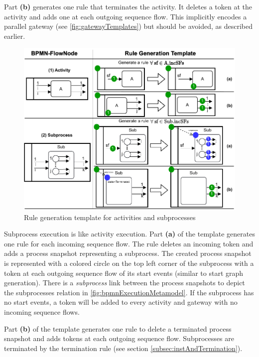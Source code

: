 \documentclass{lmcs} %
\begin{document}
Part \textbf{(b)} generates one rule that terminates the activity.
It deletes a token at the activity and adds one at each outgoing sequence flow.
This implicitly encodes a parallel gateway (see \autoref{fig:gatewayTemplates}) but should be avoided, as described earlier. 

\begin{figure}[ht]
    \centering
    \includegraphics[width=1\textwidth]{images/activities_template.pdf}
    \caption{Rule generation template for activities and subprocesses}
    \label{fig:activityTemplates}
\end{figure}

Subprocess execution is like activity execution.
Part \textbf{(a)} of the template generates one rule for each incoming sequence flow.
The rule deletes an incoming token and adds a process snapshot representing a subprocess. 
The created process snapshot is represented with a colored circle on the top left corner of the subprocess with a token at each outgoing sequence flow of its start events (similar to start graph generation).
There is a \textit{subprocess} link between the process snapshots to depict the \textsf{subprocesses} relation in \autoref{fig:bpmnExecutionMetamodel}.
If the subprocess has no start events, a token will be added to every activity and gateway with no incoming sequence flows.

Part \textbf{(b)} of the template generates one rule to delete a terminated process snapshot and adds tokens at each outgoing sequence flow.
Subprocesses are terminated by the termination rule (see section \ref{subsec:instAndTermination}).
\end{document}
